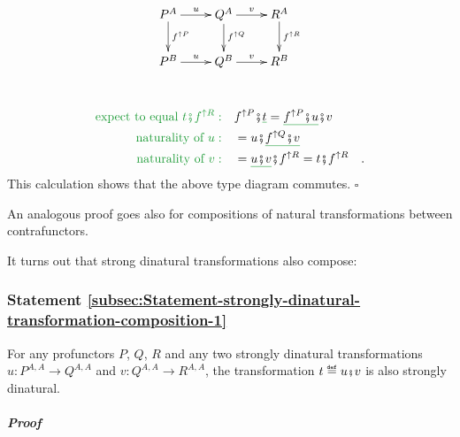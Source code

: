 \begin{wrapfigure}{l}{0.3\columnwidth}%
\vspace{-1.6\baselineskip}
\[
\xymatrix{\xyScaleY{1.8pc}\xyScaleX{2.0pc}P^{A}\ar[d]\sp(0.45){f^{\uparrow P}}\ar[r]\sp(0.5){u} & Q^{A}\ar[d]\sp(0.45){f^{\uparrow Q}}\ar[r]\sp(0.5){v} & R^{A}\ar[d]\sp(0.45){f^{\uparrow R}}\\
P^{B}\ar[r]\sp(0.5){u} & Q^{B}\ar[r]\sp(0.5){v} & R^{B}
}
\]
\vspace{-2.8\baselineskip}
\end{wrapfigure}%

~\vspace{-1\baselineskip}
\begin{align*}
{\color{greenunder}\text{expect to equal }t\bef f^{\uparrow R}:}\quad & f^{\uparrow P}\bef\gunderline t=\gunderline{f^{\uparrow P}\bef u}\bef v\\
{\color{greenunder}\text{naturality of }u:}\quad & =u\bef\gunderline{f^{\uparrow Q}\bef v}\\
{\color{greenunder}\text{naturality of }v:}\quad & =\gunderline{u\bef v}\bef f^{\uparrow R}=t\bef f^{\uparrow R}\quad.
\end{align*}
This calculation shows that the above type diagram commutes. $\square$

An analogous proof goes also for compositions of natural transformations
between contrafunctors.

It turns out that strong dinatural transformations also compose:

\subsubsection{Statement \label{subsec:Statement-strongly-dinatural-transformation-composition-1}\ref{subsec:Statement-strongly-dinatural-transformation-composition-1}}

For any profunctors $P$, $Q$, $R$ and any two strongly dinatural
transformations $u:P^{A,A}\rightarrow Q^{A,A}$ and $v:Q^{A,A}\rightarrow R^{A,A}$,
the transformation $t\triangleq u\bef v$ is also strongly dinatural.

\subparagraph{Proof}

